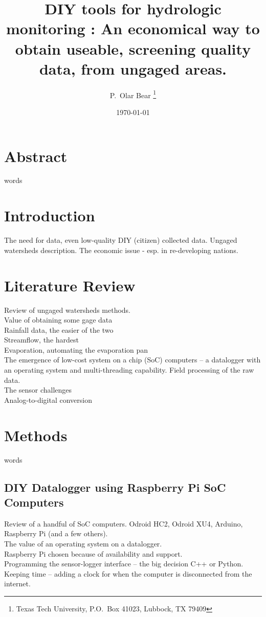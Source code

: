\documentclass[11pt]{article}
\title{DIY tools for hydrologic monitoring :  An economical way to obtain useable, screening quality data, from ungaged areas.}
\author{P.\ Olar Bear \thanks{Texas Tech University, P.O.~Box 41023, Lubbock, TX 79409}  \\
}
\date{\today}
\begin{document}
\maketitle

\section*{Abstract}
words



\section{Introduction}
The need for data, even low-quality DIY (citizen) collected data.
Ungaged watersheds description.
The economic issue - esp. in re-developing nations.
\section{Literature Review} 
Review of ungaged watersheds methods. \\
Value of obtaining some gage data \\
Rainfall data, the easier of the two \\
Streamflow, the hardest \\
Evaporation, automating the evaporation pan \\
The emergence of low-cost system on a chip (SoC) computers -- a datalogger with an operating system and multi-threading capability.  
Field processing of the raw data. \\
The sensor challenges \\
Analog-to-digital conversion \\
\section{Methods}
words
\subsection{DIY Datalogger using Raspberry Pi SoC Computers}
Review of a handful of SoC computers.  Odroid HC2, Odroid XU4, Arduino, Raspberry Pi (and a few others).\\
The value of an operating system on a datalogger. \\
Raspberry Pi chosen because of availability and support. \\
Programming the sensor-logger interface -- the big decision C++ or Python.\\
Keeping time -- adding a clock for when the computer is disconnected from the internet.\\
\end{document}
